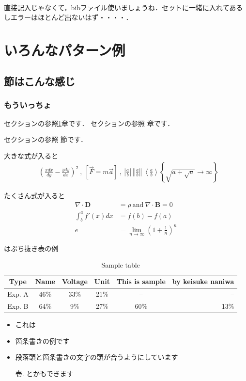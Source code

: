 \documentclass[platex,dvipdfmx]{jlreq}%
\numberwithin{equation}{section}%
\begin{document}
直接記入じゃなくて，bibファイル使いましょうね．セットに一緒に入れてあるしエラーはほとんど出ないはず・・・・．

\section{いろんなパターン例}\label{sec:基本}
\subsection{節はこんな感じ}\label{sec:基本2}
\subsubsection{もういっちょ}

セクションの参照\ref{sec:基本}章です．
セクションの参照 章です．

セクションの参照 節です．

大きな式が入ると
\begin{align}
 & \left(\frac{xdx}{dy} -\frac{ydy}{dx}\right)^{2} \ ,\ \left[\vec{F} =m\vec{a}\right] \ ,\ \left| \frac{a}{b}\right| \ \left\Vert \frac{a}{b}\right\Vert \ \left< \frac{a}{b}\right> \left\{\sqrt{a+\sqrt{a}}\rightarrow \infty \right\} 
\end{align}

たくさん式が入ると
\begin{align}
 \nabla \cdot \mathbf{D} & =\rho \ \mathrm{and} \ \nabla \cdot \mathbf{B} =0\ \\
 \int ^{a}_{b} f'( x) dx & = f( b) -f( a)\\
 e &= \lim\limits _{n\rightarrow \infty }\left( 1+\frac{1}{n}\right)^{n}
\end{align}

はぶち抜き表の例

\begin{table}[tb]
  \caption{Sample table}
   \label{tab:test}
   \centering
   \begin{tabular}{cccccr}\hline
    Type & Name & Voltage & Unit & This is sample & by keisuke naniwa\\ \hline \hline
   Exp. A & 46\%& 33\%& 21\%& --& --\\ 
   Exp. B & 64\%& 9\%& 27\%& 60\%& 13\%\\ \hline    
   \end{tabular}
\end{table}

\begin{itemize}
 \item これは
 \item 箇条書きの例です
 \item 段落頭と箇条書きの文字の頭が合うようにしています
 \item[壱.] とかもできます 
\end{itemize}
\end{document}
